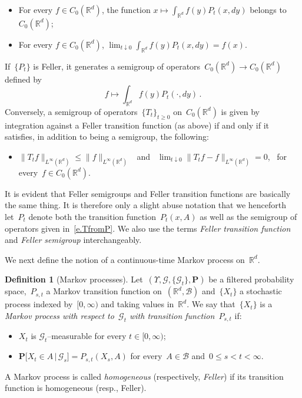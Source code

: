 \documentclass[11pt]{article} %
\numberwithin{equation}{section}
\theoremstyle{definition}
\newtheorem{definition}[theorem]{Definition}
\newcommand*{\Rd}{\ensuremath{\mathbb{R}^d}}
\begin{document}
\begin{itemize}
\item For every $f \in C_0(\Rd)$, 
the function $\displaystyle x\mapsto \int_{\Rd} f(y) P_t (x,dy)$ belongs to~$C_0(\Rd)$;
\item For every $f\in C_0(\Rd)$, 
$\displaystyle\lim_{t \downarrow 0} 
\int_{\Rd} f(y) P_t (x,dy) = f(x)
$. 
\end{itemize}
If~$\{ P_t\}$ is Feller, it generates a semigroup of operators~$C_0(\Rd) \to C_0(\Rd)$ defined by
\begin{equation}
\label{e.TfromP}
f \mapsto \int_{\Rd}f(y) P_{t}(\cdot,dy)  
\,.
\end{equation}
Conversely, a semigroup of operators~$\{ T_t \}_{t\geq 0}$ on~$C_0(\Rd)$ is given by integration against a Feller transition function (as above) if and only if it satisfies, in addition to being a semigroup, the following:
\begin{itemize}

\item $\| T_t f \|_{L^\infty(\Rd)} \leq \| f \|_{L^\infty(\Rd)}$ \
and \
$\displaystyle\lim_{t \downarrow 0} \| T_t f -f \|_{L^\infty(\Rd)} = 0$, \ for every~$f\in C_0(\Rd)$. 

\end{itemize}
It is evident that Feller semigroups and Feller transition functions are basically the same thing. It is therefore only a slight abuse notation that we henceforth let~$P_t$ denote both the transition function~$P_t(x,A)$ as well as the semigroup of operators given in~\eqref{e.TfromP}. We also use the terms \emph{Feller transition function} and \emph{Feller semigroup} interchangeably. 

\smallskip

We next define the notion of a continuous-time Markov process on~$\Rd$. 
\begin{definition}[Markov processes]
Let~$(\Upsilon, \mathcal{G}, \{ \mathcal{G}_t \},\mathbf{P})$ be a filtered probability space,~$P_{s,t}$ a Markov transition function on~$(\Rd,\mathscr{B})$ and~$\{ X_t \}$ a stochastic process indexed by~$[0,\infty)$ and taking values in~$\Rd$. 
We say that~$\{ X_t \}$ is a \emph{Markov process with respect to~$\mathcal{G}_t$ with transition function~$P_{s,t}$} if:
\begin{itemize}
\item $X_t$ is $\mathcal{G}_t$--measurable for every $t\in [0,\infty)$;
\item $\displaystyle\mathbf{P} \bigl[ X_t \in A \, | \, \mathcal{G}_s \bigr] = P_{s,t}(X_s,A)$
for every~$A \in \mathscr{B}$ and~$0\leq s < t < \infty$.
\end{itemize}
A Markov process is called \emph{homogeneous} (respectively, \emph{Feller}) if its transition function is homogeneous (resp., Feller). 
\end{definition}
\end{document}
